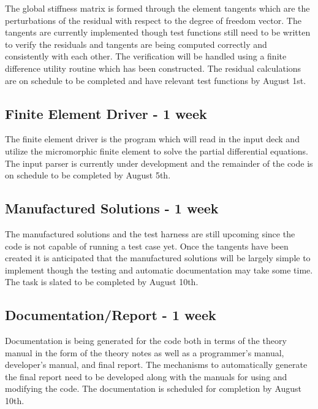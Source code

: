 The global stiffness matrix is formed through the element tangents which are the perturbations of the residual with respect to the degree of freedom vector. The tangents are currently implemented though test functions still need to be written to verify the residuals and tangents are being computed correctly and consistently with each other. The verification will be handled using a finite difference utility routine which has been constructed. The residual calculations are on schedule to be completed and have relevant test functions by August 1st.

\subsection{Finite Element Driver - 1 week}

The finite element driver is the program which will read in the input deck and utilize the micromorphic finite element to solve the partial differential equations. The input parser is currently under development and the remainder of the code is on schedule to be completed by August 5th.

\subsection{Manufactured Solutions - 1 week}

The manufactured solutions and the test harness are still upcoming since the code is not capable of running a test case yet. Once the tangents have been created it is anticipated that the manufactured solutions will be largely simple to implement though the testing and automatic documentation may take some time. The task is slated to be completed by August 10th.

\subsection{Documentation/Report - 1 week}

Documentation is being generated for the code both in terms of the theory manual in the form of the theory notes as well as a programmer's manual, developer's manual, and final report. The mechanisms to automatically generate the final report need to be developed along with the manuals for using and modifying the code. The documentation is scheduled for completion by August 10th.

